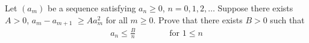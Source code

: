 Let $(a_m)$ be a sequence satisfying $a_n \geq 0$, $n=0,1,2,\ldots$ Suppose there exists $A >0$, $a_m - a_{m+1}$ $\geq A a_m ^2$ for all $m \geq 0$. Prove that there exists $B>0$ such that
\begin{align*} a_n \le \frac{B}{n} \qquad \qquad \text{for }1 \le n \end{align*}